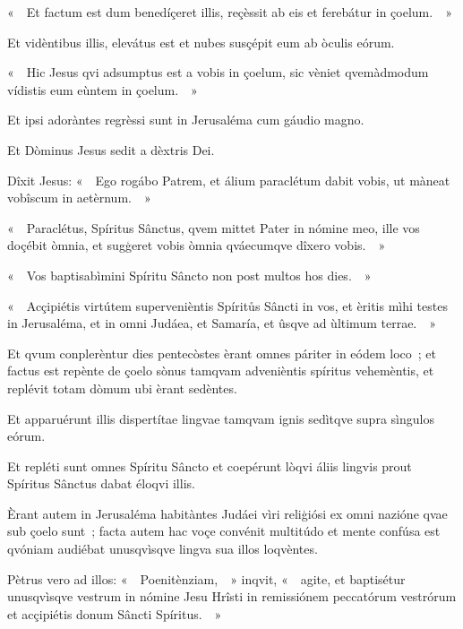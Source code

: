 «~~Et factum est dum benedíçeret illis, reçèssit ab eis et ferebátur in çoelum.~~»

Et vidèntibus illis, elevátus est et nubes susçépit eum ab òculis eórum.

«~~Hic Jesus qvi adsumptus est a vobis in çoelum, sic vèniet qvemàdmodum vídistis eum eùntem in çoelum.~~»

Et ipsi adoràntes regrèssi sunt in Jerusaléma cum gáudio magno.

Et Dòminus Jesus sedit a dèxtris Dei.


Dîxit Jesus: «~~Ego rogábo Patrem, et álium paraclétum dabit vobis, ut màneat vobîscum in aetèrnum.~~»

«~~Paraclétus, Spíritus Sânctus, qvem mittet Pater in nómine meo, ille vos doçébit òmnia, et sugģeret vobis òmnia qváecumqve dîxero vobis.~~»

«~~Vos baptisabìmini Spíritu Sâncto non post multos hos dies.~~»

«~~Acçipiétis virtútem supervenièntis Spíritůs Sâncti in vos, et èritis mìhi testes in Jerusaléma, et in omni Judáea, et Samaría, et ûsqve ad ùltimum terrae.~~»

Et qvum conplerèntur dies pentecòstes èrant omnes páriter in eódem loco~; et factus est repènte de çoelo sònus tamqvam advenièntis spíritus vehemèntis, et replévit totam dòmum ubi èrant sedèntes.

Et apparuérunt illis dispertítae lingvae tamqvam ignis sedìtqve supra sìngulos eórum.

Et repléti sunt omnes Spíritu Sâncto et coepérunt lòqvi áliis lingvis prout Spíritus Sânctus dabat éloqvi illis.

Èrant autem in Jerusaléma habitàntes Judáei vìri reliģiósi ex omni nazióne qvae sub çoelo sunt~; facta autem hac voçe convénit multitúdo et mente confúsa est qvóniam audiébat unusqvìsqve lingva sua illos loqvèntes.

Pètrus vero ad illos: «~~Poenitènziam,~~» inqvit, «~~agite, et baptisétur unusqvìsqve vestrum in nómine Jesu Hrîsti in remissiónem peccatórum vestrórum et acçipiétis donum Sâncti Spíritus.~~»

